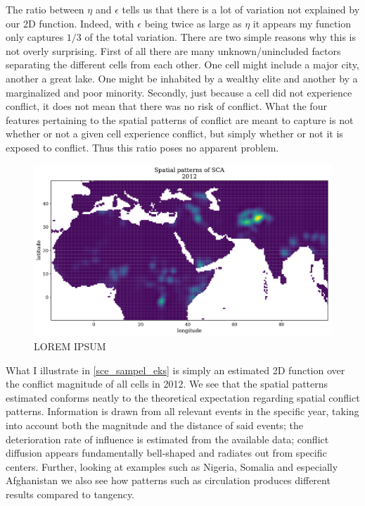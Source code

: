 \documentclass[a4paper]{article}
\begin{document}
The ratio between $\eta$ and $\epsilon$ tells us that there is a lot of variation not explained by our 2D function. Indeed, with $\epsilon$ being twice as large as $\eta$ it appears my function only captures $1/3$ of the total variation. There are two simple reasons why this is not overly surprising. First of all there are many unknown/unincluded factors separating the different cells from each other. One cell might include a major city, another a great lake. One might be inhabited by a wealthy elite and another by a marginalized and poor minority. Secondly, just because a cell did not experience conflict, it does not mean that there was no risk of conflict. What the four features pertaining to the spatial patterns of conflict are meant to capture is not whether or not a given cell experience conflict, but simply whether or not it is exposed to conflict. Thus this ratio poses no apparent problem.\par

\begin{figure}[!htb]
	\centering
	\includegraphics[scale=0.47]{sce_2012_samples.pdf}
    \caption{\footnotesize{LOREM IPSUM}}\label{sce_sampel_eks}
\end{figure}

What I illustrate in \autoref{sce_sampel_eks} is simply an estimated 2D function over the conflict magnitude of all cells in 2012. We see that the spatial patterns estimated conforms neatly to the theoretical expectation regarding spatial conflict patterns. Information is drawn from all relevant events in the specific year, taking into account both the magnitude and the distance of said events; the deterioration rate of influence is estimated from the available data; conflict diffusion appears fundamentally bell-shaped and radiates out from specific centers. Further, looking at examples such as Nigeria, Somalia and especially Afghanistan we also see how patterns such as circulation produces different results compared to tangency.\par  
\end{document}
